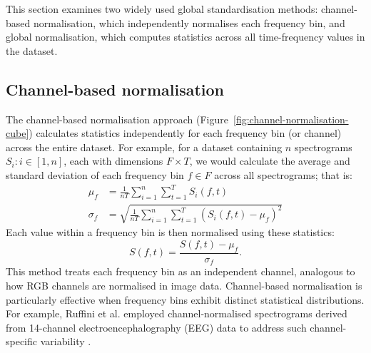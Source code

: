 This section examines two widely used global standardisation methods: channel-based normalisation, which independently normalises each frequency bin, and global normalisation, which computes statistics across all time-frequency values in the dataset.



\subsection{Channel-based normalisation}
The channel-based normalisation approach (Figure~\ref{fig:channel-normalisation-cube}) calculates statistics independently for each frequency bin (or channel) across the entire dataset. For example, for a dataset containing $n$ spectrograms $S_i : i \in [1, n]$, each with dimensions $F \times T$, we would calculate the average and standard deviation of each frequency bin $f \in F$ across all spectrograms; that is:
\begin{align}
    \mu_f &= \frac{1}{nT} \sum_{i=1}^n \sum_{t=1}^T S_i(f, t) \\
    \sigma_f &= \sqrt{\frac{1}{nT} \sum_{i=1}^n \sum_{t=1}^T \left(S_i(f, t) - \mu_f\right)^2}
\end{align}
Each value within a frequency bin is then normalised using these statistics:
\begin{equation}
    S(f,t) = \frac{S(f,t) - \mu_f}{\sigma_f}.
\end{equation}
This method treats each frequency bin as an independent channel, analogous to how RGB channels are normalised in image data. Channel-based normalisation is particularly effective when frequency bins exhibit distinct statistical distributions. For example, Ruffini et al. employed channel-normalised spectrograms derived from 14-channel electroencephalography (EEG) data to address such channel-specific variability \cite{ruffini_deep_2019}.

